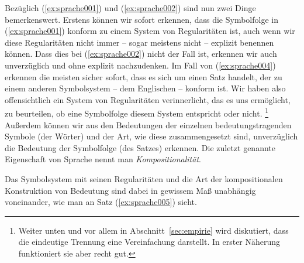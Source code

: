\begin{exe}
  \ex
  \begin{xlist}
  \end{xlist}
\end{exe}


Bezüglich (\ref{ex:sprache001}) und (\ref{ex:sprache002}) sind nun zwei Dinge bemerkenswert.
Erstens können wir sofort erkennen, dass die Symbolfolge in (\ref{ex:sprache001}) konform zu einem System von Regularitäten ist, auch wenn wir diese Regularitäten nicht immer -- sogar meistens nicht -- explizit benennen können.
Dass dies bei (\ref{ex:sprache002}) nicht der Fall ist, erkennen wir auch unverzüglich und ohne explizit nachzudenken.
Im Fall von (\ref{ex:sprache004}) erkennen die meisten sicher sofort, dass es sich um einen Satz handelt, der zu einem anderen Symbolsystem -- dem Englischen -- konform ist.
Wir haben also offensichtlich ein System von Regularitäten verinnerlicht, das es uns ermöglicht, zu beurteilen, ob eine Symbolfolge diesem System entspricht oder nicht.%
\footnote{Weiter unten und vor allem in Abschnitt~\ref{sec:empirie} wird diskutiert, dass die eindeutige Trennung eine Vereinfachung darstellt.
In erster Näherung funktioniert sie aber recht gut.}
Außerdem können wir aus den Bedeutungen der einzelnen bedeutungstragenden Symbole (der Wörter) und der Art, wie diese zusammengesetzt sind, unverzüglich die Bedeutung der Symbolfolge (des Satzes) erkennen.
Die zuletzt genannte Eigenschaft von Sprache nennt man \textit{Kompositionalität}.


Das Symbolsystem mit seinen Regularitäten und die Art der kompositionalen Konstruktion von Bedeutung sind dabei in gewissem Maß unabhängig voneinander, wie man an Satz (\ref{ex:sprache005}) sieht.

\begin{exe}
\end{exe}


